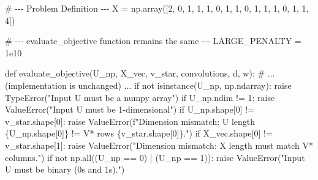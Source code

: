 \documentclass[
  letterpaper,
  DIV=11,
  numbers=noendperiod]{scrartcl}
\newenvironment{Shaded}{\begin{snugshade}}{\end{snugshade}}
\newcommand{\BuiltInTok}[1]{\textcolor[rgb]{0.00,0.23,0.31}{#1}}
\newcommand{\CommentTok}[1]{\textcolor[rgb]{0.37,0.37,0.37}{#1}}
\newcommand{\ControlFlowTok}[1]{\textcolor[rgb]{0.00,0.23,0.31}{#1}}
\newcommand{\DecValTok}[1]{\textcolor[rgb]{0.68,0.00,0.00}{#1}}
\newcommand{\FloatTok}[1]{\textcolor[rgb]{0.68,0.00,0.00}{#1}}
\newcommand{\KeywordTok}[1]{\textcolor[rgb]{0.00,0.23,0.31}{#1}}
\newcommand{\NormalTok}[1]{\textcolor[rgb]{0.00,0.23,0.31}{#1}}
\newcommand{\OperatorTok}[1]{\textcolor[rgb]{0.37,0.37,0.37}{#1}}
\newcommand{\PreprocessorTok}[1]{\textcolor[rgb]{0.68,0.00,0.00}{#1}}
\newcommand{\SpecialCharTok}[1]{\textcolor[rgb]{0.37,0.37,0.37}{#1}}
\newcommand{\SpecialStringTok}[1]{\textcolor[rgb]{0.13,0.47,0.30}{#1}}
\newcommand{\StringTok}[1]{\textcolor[rgb]{0.13,0.47,0.30}{#1}}
\begin{document}
\begin{Shaded}
\begin{Highlighting}[]
\CommentTok{\# {-}{-}{-} Problem Definition {-}{-}{-}}
\NormalTok{X }\OperatorTok{=}\NormalTok{ np.array([}\DecValTok{2}\NormalTok{, }\DecValTok{0}\NormalTok{, }\DecValTok{1}\NormalTok{, }\DecValTok{1}\NormalTok{, }\DecValTok{1}\NormalTok{, }\DecValTok{0}\NormalTok{, }\DecValTok{1}\NormalTok{, }\DecValTok{1}\NormalTok{, }\DecValTok{0}\NormalTok{, }\DecValTok{1}\NormalTok{, }\DecValTok{1}\NormalTok{, }\DecValTok{1}\NormalTok{, }\DecValTok{0}\NormalTok{, }\DecValTok{1}\NormalTok{, }\DecValTok{1}\NormalTok{, }\DecValTok{4}\NormalTok{])}

\CommentTok{\# {-}{-}{-} evaluate\_objective function remains the same {-}{-}{-}}
\NormalTok{LARGE\_PENALTY }\OperatorTok{=} \FloatTok{1e10}

\KeywordTok{def}\NormalTok{ evaluate\_objective(U\_np, X\_vec, v\_star, convolutions, d, w):}
    \CommentTok{\# ... (implementation is unchanged) ...}
    \ControlFlowTok{if} \KeywordTok{not} \BuiltInTok{isinstance}\NormalTok{(U\_np, np.ndarray): }\ControlFlowTok{raise} \PreprocessorTok{TypeError}\NormalTok{(}\StringTok{"Input U must be a numpy array"}\NormalTok{)}
    \ControlFlowTok{if}\NormalTok{ U\_np.ndim }\OperatorTok{!=} \DecValTok{1}\NormalTok{: }\ControlFlowTok{raise} \PreprocessorTok{ValueError}\NormalTok{(}\StringTok{"Input U must be 1{-}dimensional"}\NormalTok{)}
    \ControlFlowTok{if}\NormalTok{ U\_np.shape[}\DecValTok{0}\NormalTok{] }\OperatorTok{!=}\NormalTok{ v\_star.shape[}\DecValTok{0}\NormalTok{]: }\ControlFlowTok{raise} \PreprocessorTok{ValueError}\NormalTok{(}\SpecialStringTok{f"Dimension mismatch: U length }\SpecialCharTok{\{}\NormalTok{U\_np}\SpecialCharTok{.}\NormalTok{shape[}\DecValTok{0}\NormalTok{]}\SpecialCharTok{\}}\SpecialStringTok{ != V* rows }\SpecialCharTok{\{}\NormalTok{v\_star}\SpecialCharTok{.}\NormalTok{shape[}\DecValTok{0}\NormalTok{]}\SpecialCharTok{\}}\SpecialStringTok{."}\NormalTok{)}
    \ControlFlowTok{if}\NormalTok{ X\_vec.shape[}\DecValTok{0}\NormalTok{] }\OperatorTok{!=}\NormalTok{ v\_star.shape[}\DecValTok{1}\NormalTok{]: }\ControlFlowTok{raise} \PreprocessorTok{ValueError}\NormalTok{(}\StringTok{"Dimension mismatch: X length must match V* columns."}\NormalTok{)}
    \ControlFlowTok{if} \KeywordTok{not}\NormalTok{ np.}\BuiltInTok{all}\NormalTok{((U\_np }\OperatorTok{==} \DecValTok{0}\NormalTok{) }\OperatorTok{|}\NormalTok{ (U\_np }\OperatorTok{==} \DecValTok{1}\NormalTok{)): }\ControlFlowTok{raise} \PreprocessorTok{ValueError}\NormalTok{(}\StringTok{"Input U must be binary (0s and 1s)."}\NormalTok{)}


\end{Highlighting}
\end{Shaded}
\end{document}

